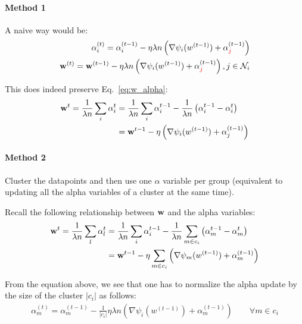 \documentclass{article}
\begin{document}
\paragraph{Method 1}

A naive way would be:
\begin{align}
\alpha_i^{(t)} = \alpha_i^{(t-1)} - \eta \lambda n \left( \nabla \psi_i(w^{(t-1)}) + \alpha_{\textcolor{red}{j}}^{(t-1)} \right) \nonumber \\
{\bf w}^{(t)} = {\bf w}^{(t-1)} - \eta \lambda n \left( \nabla \psi_i(w^{(t-1)})  + \alpha_{\textcolor{red}{j}}^{(t-1)} \right), j \in \mathcal{N}_i
\label{eq:update_w}
\end{align}

This does indeed preserve Eq.~\ref{eq:w_alpha}:
\begin{align}
{\bf w}^t = \frac{1}{\lambda n} \sum_i \alpha_i^{t} &= \frac{1}{\lambda n} \sum_i \alpha_i^{t-1} - \frac{1}{\lambda n} \left( \alpha_i^{t-1} - \alpha_i^{t} \right) \nonumber \\
&= {\bf w}^{t-1} - \eta \left( \nabla \psi_i(w^{(t-1)}) + \alpha_j^{(t-1)} \right)
\end{align}


\paragraph{Method 2}

Cluster the datapoints and then use one $\alpha$ variable per group (equivalent to updating all the alpha variables of a cluster at the same time).

Recall the following relationship between ${\bf w}$ and the alpha variables:
\begin{align}
{\bf w}^t = \frac{1}{\lambda n} \sum_l \alpha_l^{t}
&= \frac{1}{\lambda n} \sum_i \alpha_i^{t-1} - \frac{1}{\lambda n} \sum_{m \in c_i} \left( \alpha_m^{t-1} - \alpha_m^{t} \right) \nonumber \\
&= {\bf w}^{t-1} - \eta \sum_{m \in c_i} \left( \nabla \psi_m(w^{(t-1)}) + \alpha_m^{(t-1)} \right)
\label{eq:update_w_2}
\end{align}

From the equation above, we see that one has to normalize the alpha update by the size of the cluster $|c_i|$ as follows:
\begin{align}
\alpha_m^{(t)} = \alpha_m^{(t-1)} - \frac{1}{|c_i|} \eta \lambda n \left( \nabla \psi_i(w^{(t-1)}) + \alpha_m^{(t-1)} \right) \quad\quad \forall m \in c_i
\label{eq:update_alpha_2}
\end{align}
\end{document}
